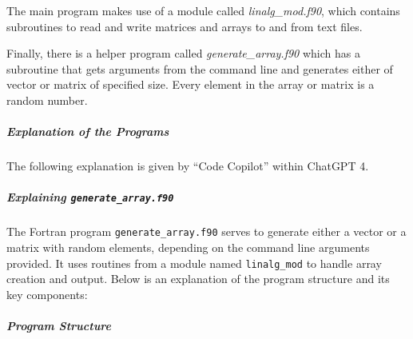 The main program makes use of a module called \textit{linalg\_mod.f90}, which contains subroutines to read and write matrices and arrays to and from text files.

Finally, there is a helper program called \textit{generate\_array.f90} which has a subroutine that gets arguments from the command line and generates either of vector or matrix of specified size.  Every element in the array or matrix is a random number.

\subparagraph{Explanation of the Programs}

The following explanation is given by ``Code Copilot'' within ChatGPT 4.

\subparagraph{Explaining \texttt{generate\_array.f90}}

The Fortran program \texttt{generate\_array.f90} serves to generate either a vector or a matrix with random elements, depending on the command line arguments provided. It uses routines from a module named \texttt{linalg\_mod} to handle array creation and output. Below is an explanation of the program structure and its key components:

\subparagraph{Program Structure}

